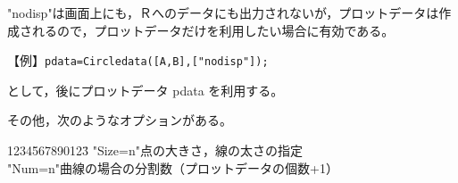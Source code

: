 \documentclass[papersize,a4paper,10pt,uplatex]{jsarticle}
\begin{document}
 "nodisp"は画面上にも，Ｒへのデータにも出力されないが，プロットデータは作成されるので，プロットデータだけを利用したい場合に有効である。
 
\hspace{10mm}【例】\verb|pdata=Circledata([A,B],["nodisp"]);|

として，後にプロットデータ pdata を利用する。

その他，次のようなオプションがある。
\begin{tabbing}
1234\=567890123\=\kill
 \>"Size=n"\>点の大きさ，線の太さの指定\\
 \>"Num=n"\>曲線の場合の分割数（プロットデータの個数+1）\\
\end{tabbing}

\end{document}
